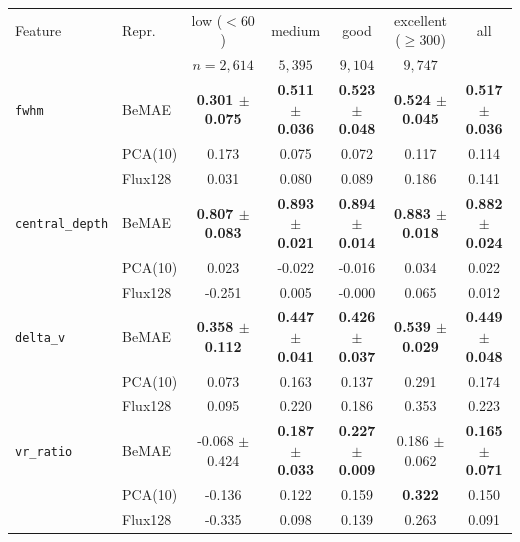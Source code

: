 \begin{tabular}{llccccc}
  \toprule
  Feature & Repr.\ & low ($<\!60$) & medium & good & excellent ($\geq\!300$) & all \\
   &  & $n\!=\!2{,}614$ & $5{,}395$ & $9{,}104$ & $9{,}747$ & \\
  \midrule
  \texttt{fwhm}              & BeMAE    & \textbf{0.301 $\pm$ 0.075} & \textbf{0.511 $\pm$ 0.036} & \textbf{0.523 $\pm$ 0.048} & \textbf{0.524 $\pm$ 0.045} & \textbf{0.517 $\pm$ 0.036} \\
                             & PCA(10)  & 0.173 & 0.075 & 0.072 & 0.117 & 0.114 \\
                             & Flux128  & 0.031 & 0.080 & 0.089 & 0.186 & 0.141 \\
  \midrule
  \texttt{central\_depth}    & BeMAE    & \textbf{0.807 $\pm$ 0.083} & \textbf{0.893 $\pm$ 0.021} & \textbf{0.894 $\pm$ 0.014} & \textbf{0.883 $\pm$ 0.018} & \textbf{0.882 $\pm$ 0.024} \\
                             & PCA(10)  & 0.023 & -0.022 & -0.016 & 0.034 & 0.022 \\
                             & Flux128  & -0.251 & 0.005 & -0.000 & 0.065 & 0.012 \\
  \midrule
  \texttt{delta\_v}          & BeMAE    & \textbf{0.358 $\pm$ 0.112} & \textbf{0.447 $\pm$ 0.041} & \textbf{0.426 $\pm$ 0.037} & \textbf{0.539 $\pm$ 0.029} & \textbf{0.449 $\pm$ 0.048} \\
                             & PCA(10)  & 0.073 & 0.163 & 0.137 & 0.291 & 0.174 \\
                             & Flux128  & 0.095 & 0.220 & 0.186 & 0.353 & 0.223 \\
  \midrule
  \texttt{vr\_ratio}         & BeMAE    & -0.068 $\pm$ 0.424 & \textbf{0.187 $\pm$ 0.033} & \textbf{0.227 $\pm$ 0.009} & 0.186 $\pm$ 0.062 & \textbf{0.165 $\pm$ 0.071} \\
                             & PCA(10)  & -0.136 & 0.122 & 0.159 & \textbf{0.322} & 0.150 \\
                             & Flux128  & -0.335 & 0.098 & 0.139 & 0.263 & 0.091 \\
  \bottomrule
\end{tabular}
